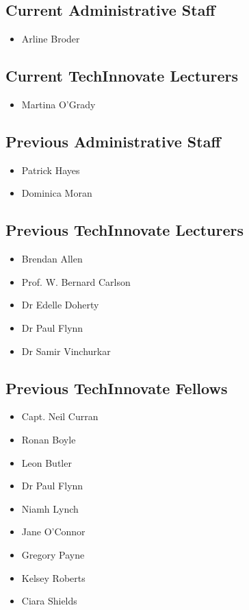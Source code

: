 \documentclass[10pt,a4paper]{res} %
\begin{document}
\begin{resume}
\subsection*{Current Administrative Staff}

\begin{itemize} \itemsep -2pt
\item Arline Broder
\end{itemize}

\subsection*{Current TechInnovate Lecturers}

\begin{itemize} \itemsep -2pt
\item Martina O'Grady
\end{itemize}

\subsection*{Previous Administrative Staff}

\begin{itemize} \itemsep -2pt
\item Patrick Hayes
\item Dominica Moran
\end{itemize}

\subsection*{Previous TechInnovate Lecturers}

\begin{itemize} \itemsep -2pt
\item Brendan Allen
\item Prof. W. Bernard Carlson
\item Dr Edelle Doherty
\item Dr Paul Flynn
\item Dr Samir Vinchurkar
\end{itemize}

\subsection*{Previous TechInnovate Fellows}

\begin{itemize} \itemsep -2pt
\item Capt. Neil Curran
\item Ronan Boyle
\item Leon Butler
\item Dr Paul Flynn
\item Niamh Lynch
\item Jane O'Connor
\item Gregory Payne
\item Kelsey Roberts
\item Ciara Shields
\end{itemize}


\end{resume}
\end{document}
